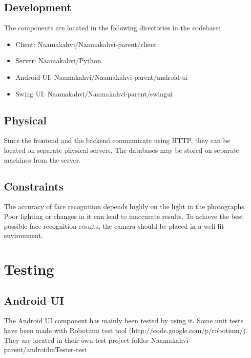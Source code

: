 \documentclass[11pt]{article}
\begin{document}
\subsection{Development}

The components are located in the following directories in the codebase:
\begin{itemize}
\item Client: Naamakahvi/Naamakahvi-parent/client

\item Server: Naamakahvi/Python

\item Android UI: Naamakahvi/Naamakahvi-parent/android-ui

\item Swing UI: Naamakahvi/Naamakahvi-parent/swingui
\end{itemize}


\subsection{Physical}

Since the frontend and the backend communicate using HTTP, they can be
located on separate physical servers. The databases may be stored on separate
machines from the server.

\subsection{Constraints}
The accuracy of face recognition depends highly on the light in the 
photographs. Poor lighting or changes in it can lead to inaccurate results.
To achieve the best possible face recognition results, the camera should be 
placed in a well lit environment.

\section{Testing}

\subsection{Android UI}
The Android UI component has mainly been tested by using it. Some unit tests have been made
with Robotium test tool (http://code.google.com/p/robotium/). They are located in their own
test project folder Naamakahvi-parent/androiduiTester-test
\end{document}
